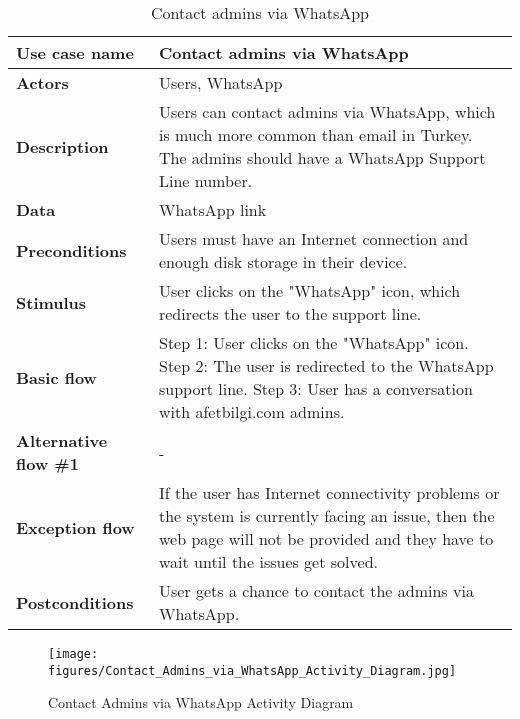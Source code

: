 \documentclass[listof=nochaptergap]{report}
\begin{document}
    \begin{table}[H]
        \centering
         \begin{tabular}{| p{4cm} | p{10cm} |} 
         \hline
         \textbf{Use case name} & Contact admins via WhatsApp \\
         \hline
         \textbf{Actors} & Users, WhatsApp \\
         \hline
         \textbf{Description} & Users can contact admins via WhatsApp, which is much more common than email in Turkey. The admins should have a WhatsApp Support Line number.  \\
         \hline
         \textbf{Data} & WhatsApp link \\
         \hline
         \textbf{Preconditions} & Users must have an Internet connection and enough disk storage in their device. \\
         \hline
         \textbf{Stimulus} & User clicks on the "WhatsApp" icon, which redirects the user to the support line. \\
         \hline
         \textbf{Basic flow} & Step 1: User clicks on the "WhatsApp" icon. \newline Step 2: The user is redirected to the WhatsApp support line. \newline Step 3: User has a conversation with afetbilgi.com admins. \\
         \hline
         \textbf{Alternative flow \#1} & - \\
         \hline
         \textbf{Exception flow} & If the user has Internet connectivity problems or the system is currently facing an issue, then the web page will not be provided and they have to wait until the issues get solved. \\
         \hline
         \textbf{Postconditions} & User gets a chance to contact the admins via WhatsApp. \\
         \hline
         \end{tabular}
        \caption{Contact admins via WhatsApp}
        \label{tab:table17}
    \end{table}

        \begin{center}
            \begin{figure}[H]
                \centering
                \texttt{[image: figures/Contact\_Admins\_via\_WhatsApp\_Activity\_Diagram.jpg]}
                \caption{Contact Admins via WhatsApp Activity Diagram} 
                \label{fig:figure1}
            \end{figure}
        \end{center}
\end{document}
